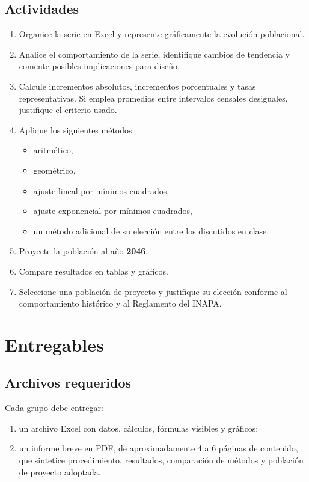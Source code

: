 \documentclass[11pt]{scrartcl}
\begin{document}
\subsection{Actividades}
\begin{enumerate}
  \item Organice la serie en Excel y represente gráficamente la
    evolución poblacional.
  \item Analice el comportamiento de la serie, identifique cambios de
    tendencia y comente posibles implicaciones para diseño.
  \item Calcule incrementos absolutos, incrementos porcentuales y tasas
    representativas. Si emplea promedios entre intervalos censales
    desiguales, justifique el criterio usado.
  \item Aplique los siguientes métodos:
    \begin{itemize}
      \item aritmético,
      \item geométrico,
      \item ajuste lineal por mínimos cuadrados,
      \item ajuste exponencial por mínimos cuadrados,
      \item un método adicional de su elección entre los discutidos en
        clase.
    \end{itemize}
  \item Proyecte la población al año \textbf{2046}.
  \item Compare resultados en tablas y gráficos.
  \item Seleccione una población de proyecto y justifique su elección
    conforme al comportamiento histórico y al Reglamento del INAPA.
\end{enumerate}

\section{Entregables}

\subsection{Archivos requeridos}
Cada grupo debe entregar:
\begin{enumerate}
  \item un archivo Excel con datos, cálculos, fórmulas visibles y
    gráficos;
  \item un informe breve en PDF, de aproximadamente 4 a 6 páginas de
    contenido, que sintetice procedimiento, resultados, comparación de
    métodos y población de proyecto adoptada.
\end{enumerate}
\end{document}
